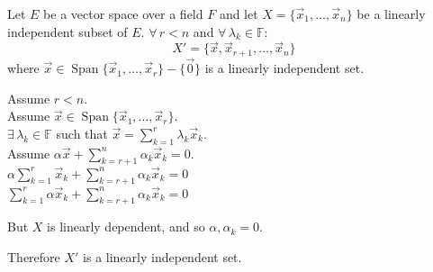 \documentclass[letterpaper,12pt,fleqn]{article}
\renewcommand{\a}{\alpha}
\renewcommand{\l}{\lambda}
\newcommand{\F}{\mathbb{F}}
\newcommand{\vx}{\vec{x}}
\newcommand{\vo}{\vec{0}}
\DeclareMathOperator{\spn}{Span}
\begin{document}
\begin{theorem}
  Let $E$ be a vector space over a field $F$ and let $X=\{\vx_1,\ldots,\vx_n\}$
  be a linearly independent subset of $E$. $\forall\,r<n$ and
  $\forall\,\l_k\in\F$:
  \[X'=\{\vx,\vx_{r+1},\ldots,\vx_n\}\]
  where $\vx\in\spn\{\vx_1,\ldots,\vx_r\}-\{\vo\}$
  is a linearly independent set.
\end{theorem}

\begin{theproof}
  Assume $r<n$. \\
  Assume $\vx\in\spn\{\vx_1,\ldots,\vx_r\}$. \\
  $\exists\,\l_k\in\F$ such that $\vx=\sum_{k=1}^r\l_k\vx_k$. \\
  Assume $\a\vx+\sum_{k=r+1}^n\a_k\vx_k=0$. \\
  $\a\sum_{k=1}^r\vx_k+\sum_{k=r+1}^n\a_k\vx_k=0$ \\
  $\sum_{k=1}^r\a\vx_k+\sum_{k=r+1}^n\a_k\vx_k=0$
  
  But $X$ is linearly dependent, and so $\a,\a_k=0$.

  Therefore $X'$ is a linearly independent set.
\end{theproof}
\end{document}
